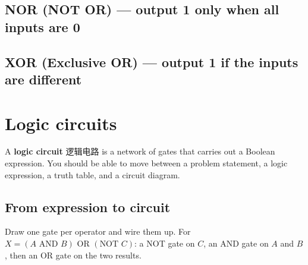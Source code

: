 \documentclass[11pt]{article}
\begin{document}
\subsection*{NOR (NOT OR) — output 1 only when all inputs are 0}

\begin{center}
\end{center}

\subsection*{XOR (Exclusive OR) — output 1 if the inputs are \textbf{different}}

\begin{center}
\end{center}

\section*{Logic circuits}

A \textbf{logic circuit} 逻辑电路 is a network of gates that carries out a Boolean expression. You should be able to move between a problem statement, a logic expression, a truth table, and a circuit diagram.

\subsection*{From expression to circuit}

Draw one gate per operator and wire them up. For $X = (A \text{ AND } B) \text{ OR } (\text{NOT } C)$: a NOT gate on $C$, an AND gate on $A$ and $B$, then an OR gate on the two results.
\end{document}
